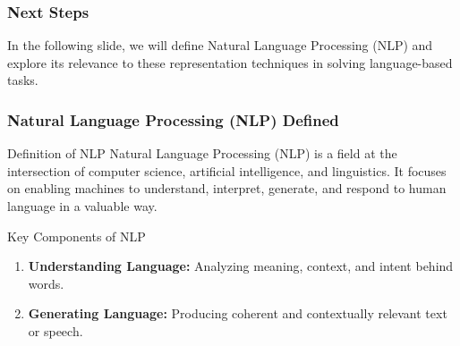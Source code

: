 \documentclass[aspectratio=169]{beamer}
\begin{document}
\begin{frame}[fragile]
    \frametitle{Next Steps}
    In the following slide, we will define Natural Language Processing (NLP) and explore its relevance to these representation techniques in solving language-based tasks.
\end{frame}

\begin{frame}[fragile]
    \frametitle{Natural Language Processing (NLP) Defined}
    \begin{block}{Definition of NLP}
        Natural Language Processing (NLP) is a field at the intersection of computer science, artificial intelligence, and linguistics. It focuses on enabling machines to understand, interpret, generate, and respond to human language in a valuable way.
    \end{block}
    
    \begin{block}{Key Components of NLP}
        \begin{enumerate}
            \item \textbf{Understanding Language:} Analyzing meaning, context, and intent behind words.
            \item \textbf{Generating Language:} Producing coherent and contextually relevant text or speech.
        \end{enumerate}
    \end{block}
\end{frame}
\end{document}

